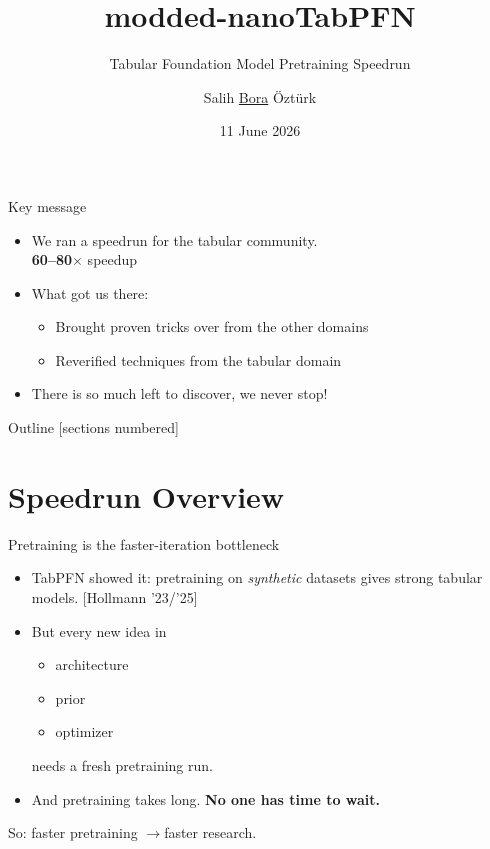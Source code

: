 \documentclass[aspectratio=169,10pt]{beamer}
\title{modded-nanoTabPFN}
\subtitle{Tabular Foundation Model Pretraining Speedrun}
\author{Salih \underline{Bora} Öztürk}
\institute{University of Freiburg \\ \footnotesize Supervisor: Alexander Pfefferle \\ \footnotesize Examiner: Frank Hutter}
\date{11 June 2026}
\newcommand{\hl}[1]{{\color{accent}\textbf{#1}}}
\newcommand{\cit}[1]{{\scriptsize\color{muted}[#1]}}
\begin{document}
\maketitle

\begin{frame}{Key message}
  \begin{itemize}
    \item We ran a speedrun for the tabular community.\\
      \hl{60--80$\times$} speedup
    \medskip
    \item What got us there:
    \begin{itemize}
      \item Brought proven tricks over from the other domains
      \item Reverified techniques from the tabular domain
    \end{itemize}
    \medskip
    \item There is so much left to discover, we never stop!
  \end{itemize}
\end{frame}

\begin{frame}{Outline}
  [sections numbered]
  \tableofcontents
\end{frame}

\section{Speedrun Overview}

\begin{frame}{Pretraining is the faster-iteration bottleneck}
  \begin{itemize}
    \item TabPFN showed it: pretraining on \emph{synthetic} datasets gives strong tabular models. \cit{Hollmann '23/'25}
    \medskip
    \item But every new idea in
    \begin{itemize}
      \item architecture
      \item prior
      \item optimizer
    \end{itemize}
    needs a fresh pretraining run.
    \medskip
    \item And pretraining takes long. \hl{No one has time to wait.}
  \end{itemize}
  \vfill
  \centering
  So: faster pretraining \quad$\to$\quad faster research.
\end{frame}
\end{document}
